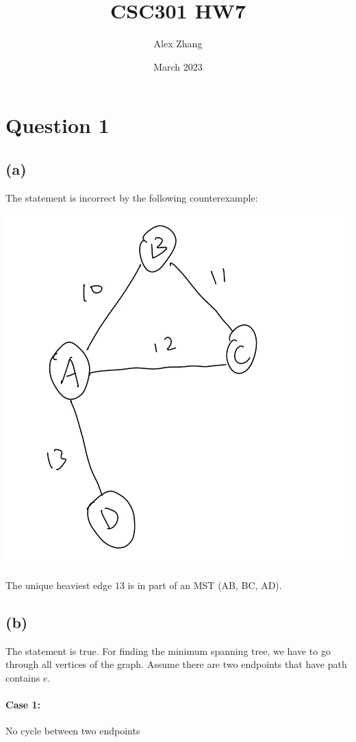 \documentclass{article}
\title{CSC301 HW7}
\author{Alex Zhang}
\date{March 2023}
\begin{document}
\maketitle
\section*{Question 1}
\subsection*{(a)}
The statement is incorrect by the following counterexample:
\begin{center}
    \includegraphics[scale = 0.2]{q1.jpg}
\end{center}
The unique heaviest edge $13$ is in part of an MST (AB, BC, AD).
\subsection*{(b)}
The statement is true. For finding the minimum spanning tree, we have to go through all vertices of the graph.
Assume there are two endpoints that have path contains $e$.
\paragraph*{Case 1:} No cycle between two endpoints
\end{document}
